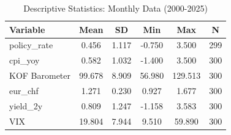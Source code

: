\begin{table}[ht]
\centering
\caption{Descriptive Statistics: Monthly Data (2000-2025)} 
\label{tab:summary_stats}
\begin{tabular}{lccccc}
  \toprule
Variable & Mean & SD & Min & Max & N \\ 
  \midrule
policy_rate & 0.456 & 1.117 & -0.750 & 3.500 & 299 \\ 
  cpi_yoy & 0.582 & 1.032 & -1.400 & 3.500 & 300 \\ 
  KOF Barometer & 99.678 & 8.909 & 56.980 & 129.513 & 300 \\ 
  eur_chf & 1.271 & 0.230 & 0.927 & 1.677 & 300 \\ 
  yield_2y & 0.809 & 1.247 & -1.158 & 3.583 & 300 \\ 
  VIX & 19.804 & 7.944 & 9.510 & 59.890 & 300 \\ 
   \bottomrule
\end{tabular}
\end{table}
